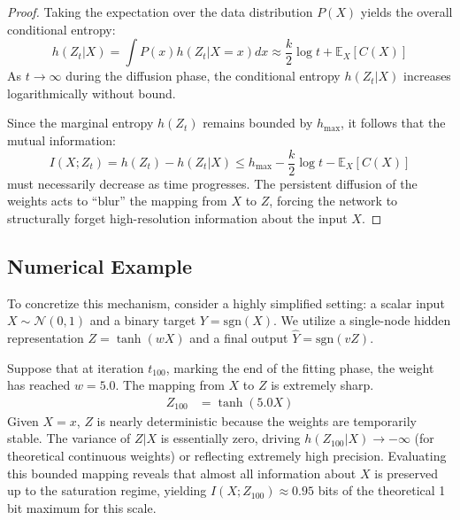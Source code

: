 \begin{proof}
    Taking the expectation over the data distribution $P(X)$ yields the overall conditional entropy:
    \begin{equation}
        h(Z_t | X) = \int P(x) h(Z_t | X=x) dx \approx \frac{k}{2} \log t + \mathbb{E}_X[C(X)]
    \end{equation}
    As $t \to \infty$ during the diffusion phase, the conditional entropy $h(Z_t | X)$ increases logarithmically without bound. 
    
    Since the marginal entropy $h(Z_t)$ remains bounded by $h_{\text{max}}$, it follows that the mutual information:
    \begin{equation}
        I(X; Z_t) = h(Z_t) - h(Z_t | X) \le h_{\text{max}} - \frac{k}{2} \log t - \mathbb{E}_X[C(X)]
    \end{equation}
    must necessarily decrease as time progresses. The persistent diffusion of the weights acts to ``blur'' the mapping from $X$ to $Z$, forcing the network to structurally forget high-resolution information about the input $X$.
\end{proof}

\subsection{Numerical Example}

To concretize this mechanism, consider a highly simplified setting: a scalar input $X \sim \mathcal{N}(0, 1)$ and a binary target $Y = \text{sgn}(X)$. We utilize a single-node hidden representation $Z = \tanh(w X)$ and a final output $\hat{Y} = \text{sgn}(v Z)$.

Suppose that at iteration $t_{100}$, marking the end of the fitting phase, the weight has reached $w = 5.0$. The mapping from $X$ to $Z$ is extremely sharp. 
\begin{align*}
    Z_{100} &= \tanh(5.0 X)
\end{align*}
Given $X=x$, $Z$ is nearly deterministic because the weights are temporarily stable. The variance of $Z|X$ is essentially zero, driving $h(Z_{100}|X) \to -\infty$ (for theoretical continuous weights) or reflecting extremely high precision. Evaluating this bounded mapping reveals that almost all information about $X$ is preserved up to the saturation regime, yielding $I(X; Z_{100}) \approx 0.95$ bits of the theoretical 1 bit maximum for this scale.

